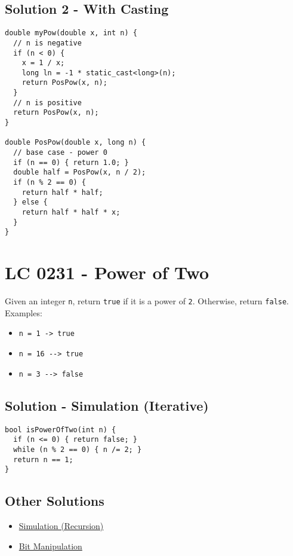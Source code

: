 \subsection*{Solution 2 - With Casting}
\begin{lstlisting}
double myPow(double x, int n) {
  // n is negative
  if (n < 0) {
    x = 1 / x;
    long ln = -1 * static_cast<long>(n);
    return PosPow(x, n);
  }
  // n is positive
  return PosPow(x, n);
}

double PosPow(double x, long n) {
  // base case - power 0
  if (n == 0) { return 1.0; }
  double half = PosPow(x, n / 2);
  if (n % 2 == 0) {
    return half * half;
  } else {
    return half * half * x;
  }
}
\end{lstlisting}

\section{LC 0231 - Power of Two}
Given an integer {\colorbox{CodeBackground}{\lstinline|n|}}, return {\colorbox{CodeBackground}{\lstinline|true|}} if it is a power of {\colorbox{CodeBackground}{\lstinline|2|}}. Otherwise, return {\colorbox{CodeBackground}{\lstinline|false|}}.\\

Examples:
\begin{itemize}
\item {\colorbox{CodeBackground}{\lstinline|n = 1 -> true|}}
\item {\colorbox{CodeBackground}{\lstinline|n = 16 --> true|}}
\item {\colorbox{CodeBackground}{\lstinline|n = 3 --> false|}}
\end{itemize}

\subsection*{Solution - Simulation (Iterative)}\label{solution:lc0231_simulation_iterative}
\begin{lstlisting}
bool isPowerOfTwo(int n) {
  if (n <= 0) { return false; }
  while (n % 2 == 0) { n /= 2; }
  return n == 1;
}
\end{lstlisting}

\subsection*{Other Solutions}
\begin{itemize}
\item \hyperref[solution:lc0231_simulation_recursion]{Simulation (Recursion)}
\item \hyperref[solution:lc0231_bit_manipulation]{Bit Manipulation}
\end{itemize}

